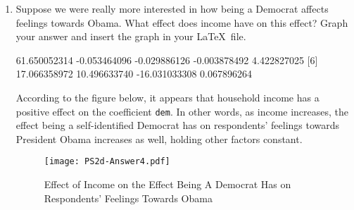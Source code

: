 \documentclass[12pt]{article}
\begin{document}
\begin{enumerate}
\item Suppose we were really more interested in how being a Democrat affects feelings towards Obama.  What effect does income have on this effect?  Graph your answer and insert the graph in your \LaTeX~file.\\

\begin{Schunk}
\begin{Soutput}
[1]  61.650052314  -0.053464096  -0.029886126  -0.003878492   4.422827025
[6]  17.066358972  10.496633740 -16.031033308   0.067896264
\end{Soutput}
\end{Schunk}

According to the figure below, it appears that household income has a positive effect on the coefficient \texttt{dem}. In other words, as income increases, the effect being a self-identified Democrat has on respondents' feelings towards President Obama increases as well, holding other factors constant.

\begin{figure}[htbp] 
  \caption{Effect of Income on the Effect Being A Democrat Has on Respondents' Feelings Towards Obama}
  \label{F:spread}
  \begin{center}
    \texttt{[image: PS2d-Answer4.pdf]}
  \end{center}
\end{figure}

\newpage


\end{enumerate}
\end{document}
